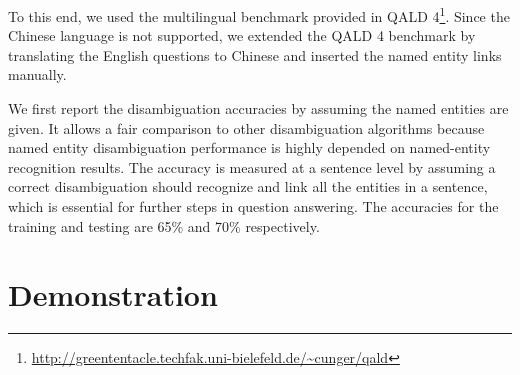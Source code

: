 To this end, we used the multilingual benchmark provided in QALD 4\footnote{\url{http://greententacle.techfak.uni-bielefeld.de/~cunger/qald}}. 
Since the Chinese language is not supported, we extended the QALD 4 benchmark by translating the English questions to Chinese and inserted the named entity links manually.

We first report the disambiguation accuracies by assuming the named entities are given. It allows a fair comparison to other disambiguation algorithms because named entity disambiguation performance is highly depended on named-entity recognition results. The accuracy is measured at a sentence level by assuming a correct disambiguation should recognize and link all the entities in a sentence, which is essential for further steps in question answering. The accuracies for the training and testing are 65\% and 70\% respectively. 



 
\section{Demonstration}
%

